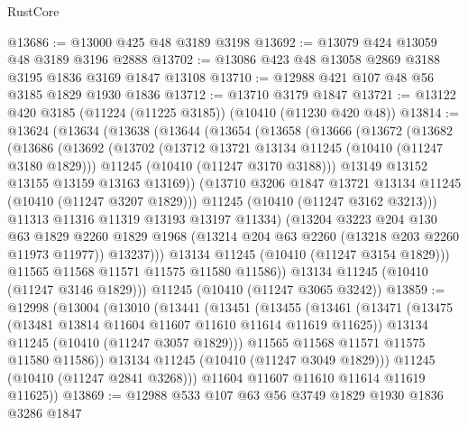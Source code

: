 \begin{lexlean}{RustCore}
\begin{coremodule}
@13686 := @13000 @425 @48 @3189 @3198
@13692 := @13079 @424 @13059 @48 @3189 @3196 @2888
@13702 := @13086 @423 @48 @13058 @2869 @3188 @3195 @1836 @3169 @1847 @13108
@13710 := @12988 @421 @107 @48 @56 @3185 @1829 @1930 @1836
@13712 := @13710 @3179 @1847
@13721 := @13122 @420 @3185 (@11224 (@11225 @3185)) (@10410 (@11230 @420 @48))
@13814 := @13624
    (@13634
      (@13638
        (@13644
          (@13654
            (@13658
              (@13666
                (@13672
                  (@13682
                    (@13686
                      (@13692
                        (@13702
                          (@13712 @13721 @13134 @11245 (@10410 (@11247 @3180 @1829)))
                          @11245
                          (@10410 (@11247 @3170 @3188)))
                        @13149
                        @13152
                        @13155
                        @13159
                        @13163
                        @13169))
                    (@13710 @3206 @1847 @13721 @13134 @11245 (@10410 (@11247 @3207 @1829)))
                    @11245
                    (@10410 (@11247 @3162 @3213)))
                  @11313
                  @11316
                  @11319
                  @13193
                  @13197
                  @11334)
                (@13204
                  @3223
                  @204
                  @130
                  @63
                  @1829
                  @2260
                  @1829
                  @1968
                  (@13214 @204 @63 @2260 (@13218 @203 @2260 @11973 @11977))
                  @13237)))
            @13134
            @11245
            (@10410 (@11247 @3154 @1829)))
          @11565
          @11568
          @11571
          @11575
          @11580
          @11586))
      @13134
      @11245
      (@10410 (@11247 @3146 @1829)))
    @11245
    (@10410 (@11247 @3065 @3242))
@13859 := @12998
    (@13004
      (@13010
        (@13441
          (@13451
            (@13455
              (@13461
                (@13471
                  (@13475 (@13481 @13814 @11604 @11607 @11610 @11614 @11619 @11625))
                  @13134
                  @11245
                  (@10410 (@11247 @3057 @1829)))
                @11565
                @11568
                @11571
                @11575
                @11580
                @11586))
            @13134
            @11245
            (@10410 (@11247 @3049 @1829)))
          @11245
          (@10410 (@11247 @2841 @3268)))
        @11604
        @11607
        @11610
        @11614
        @11619
        @11625))
@13869 := @12988 @533 @107 @63 @56 @3749 @1829 @1930 @1836 @3286 @1847

\end{coremodule}
\end{lexlean}
